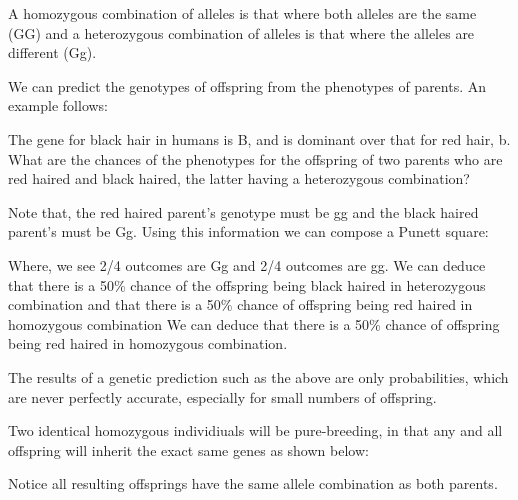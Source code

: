 A homozygous combination of alleles is that where both alleles are the same (GG) and a heterozygous
combination of alleles is that where the alleles are different (Gg).

We can predict the genotypes of offspring from the phenotypes of parents. An example follows:

\begin{center}
\begin{minipage}{0.8\textwidth}
The gene for black hair in humans is B, and is dominant over that for red hair, b. What are
the chances of the phenotypes for the offspring of two parents who are red haired and 
black haired, the latter having a heterozygous combination?

Note that, the red haired parent's genotype must be gg and the black haired parent's must be Gg.
Using this information we can compose a Punett square:

\begin{center}
\end{center}

Where, we see 2/4 outcomes are Gg and 2/4 outcomes are gg. We can deduce that there is a 50\% 
chance of the offspring being black haired in heterozygous combination and that there is a 50\%
chance of offspring being red haired in homozygous combination We can deduce that there is a 50\% 
chance of offspring being red haired in homozygous combination.
\end{minipage}
\end{center}
The results of a genetic prediction such as the above are only probabilities, which are never
perfectly accurate, especially for small numbers of offspring.

Two identical homozygous individiuals will be pure-breeding, in that any and all offspring will
inherit the exact same genes as shown below:
\begin{center}
\end{center}
Notice all resulting offsprings have the same allele combination as both parents.


